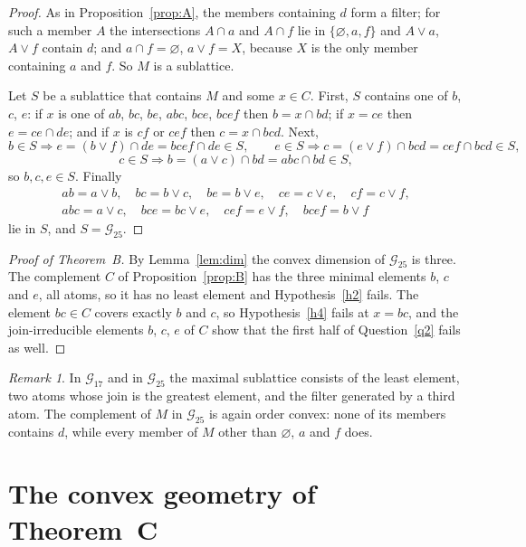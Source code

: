 \documentclass[11pt]{amsart}
\theoremstyle{definition}
\theoremstyle{remark}
\newtheorem{remark}[theorem]{Remark}
\numberwithin{equation}{section}
\begin{document}
\begin{proof}
As in Proposition~\ref{prop:A}, the members containing $d$ form a filter; for such a member $A$ the intersections $A\cap a$ and $A\cap f$ lie in $\{\varnothing,a,f\}$ and $A\vee a$, $A\vee f$ contain $d$; and $a\cap f=\varnothing$, $a\vee f=X$, because $X$ is the only member containing $a$ and $f$. So $M$ is a sublattice.

Let $S$ be a sublattice that contains $M$ and some $x\in C$. First, $S$ contains one of $b$, $c$, $e$: if $x$ is one of $ab$, $bc$, $be$, $abc$, $bce$, $bcef$ then $b=x\cap bd$; if $x=ce$ then $e=ce\cap de$; and if $x$ is $cf$ or $cef$ then $c=x\cap bcd$. Next,
\[
b\in S\Rightarrow e=(b\vee f)\cap de=bcef\cap de\in S,\qquad e\in S\Rightarrow c=(e\vee f)\cap bcd=cef\cap bcd\in S,
\]
\[
c\in S\Rightarrow b=(a\vee c)\cap bd=abc\cap bd\in S,
\]
so $b,c,e\in S$. Finally
\begin{gather*}
ab=a\vee b,\quad bc=b\vee c,\quad be=b\vee e,\quad ce=c\vee e,\quad cf=c\vee f,\\ abc=a\vee c,\quad bce=bc\vee e,\quad cef=e\vee f,\quad bcef=b\vee f
\end{gather*}
lie in $S$, and $S=\mathcal G_{25}$.
\end{proof}

\begin{proof}[Proof of Theorem~B]
By Lemma~\ref{lem:dim} the convex dimension of $\mathcal G_{25}$ is three. The complement $C$ of Proposition~\ref{prop:B} has the three minimal elements $b$, $c$ and $e$, all atoms, so it has no least element and Hypothesis~\ref{h2} fails. The element $bc\in C$ covers exactly $b$ and $c$, so Hypothesis~\ref{h4} fails at $x=bc$, and the join-irreducible elements $b$, $c$, $e$ of $C$ show that the first half of Question~\ref{q2} fails as well.
\end{proof}

\begin{remark}
In $\mathcal G_{17}$ and in $\mathcal G_{25}$ the maximal sublattice consists of the least element, two atoms whose join is the greatest element, and the filter generated by a third atom. The complement of $M$ in $\mathcal G_{25}$ is again order convex: none of its members contains $d$, while every member of $M$ other than $\varnothing$, $a$ and $f$ does.
\end{remark}

\section{The convex geometry of Theorem~C}\label{sec:C}
\end{document}

